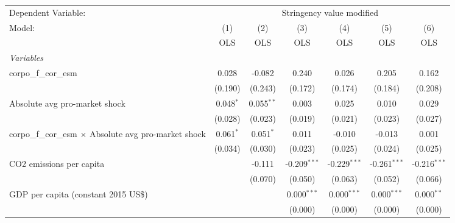
\begingroup
\centering
\begin{tabular}{lcccccc}
   \toprule
   Dependent Variable: & \multicolumn{6}{c}{Stringency value modified}\\
   Model:                                                        & (1)         & (2)          & (3)            & (4)            & (5)            & (6)\\  
                                                                 &  OLS        & OLS          & OLS            & OLS            & OLS            & OLS\\  
   \midrule
   \emph{Variables}\\
   corpo\_f\_cor\_esm                                            & 0.028       & -0.082       & 0.240          & 0.026          & 0.205          & 0.162\\   
                                                                 & (0.190)     & (0.243)      & (0.172)        & (0.174)        & (0.184)        & (0.208)\\   
   Absolute avg pro-market shock                                 & 0.048$^{*}$ & 0.055$^{**}$ & 0.003          & 0.025          & 0.010          & 0.029\\   
                                                                 & (0.028)     & (0.023)      & (0.019)        & (0.021)        & (0.023)        & (0.027)\\   
   corpo\_f\_cor\_esm $\times$ Absolute avg pro-market shock     & 0.061$^{*}$ & 0.051$^{*}$  & 0.011          & -0.010         & -0.013         & 0.001\\   
                                                                 & (0.034)     & (0.030)      & (0.023)        & (0.025)        & (0.024)        & (0.025)\\   
   CO2 emissions per capita                                      &             & -0.111       & -0.209$^{***}$ & -0.229$^{***}$ & -0.261$^{***}$ & -0.216$^{***}$\\   
                                                                 &             & (0.070)      & (0.050)        & (0.063)        & (0.052)        & (0.066)\\   
   GDP per capita (constant 2015 US\$)                           &             &              & 0.000$^{***}$  & 0.000$^{***}$  & 0.000$^{***}$  & 0.000$^{**}$\\   
                                                                 &             &              & (0.000)        & (0.000)        & (0.000)        & (0.000)\\   

\end{tabular}
